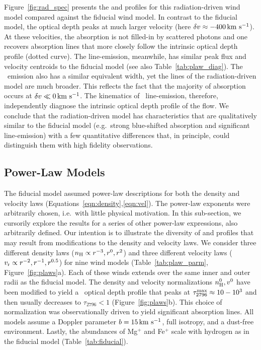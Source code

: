 \documentclass[12pt,preprint]{aastex}
\begin{document}
Figure~\ref{fig:rad_spec} presents the  and 
profiles for this radiation-driven wind model compared against the
fiducial wind model.
In contrast to the fiducial model, 
the optical depth peaks at much larger velocity (here $\delta v
\approx -400 \, {\rm km~s^{-1}}$).  At these velocities, the absorption is not
filled-in by scattered photons and one recovers absorption lines
that more closely follow the intrinsic optical depth profile (dotted
curve). The  line-emission, meanwhile, has
similar peak flux and velocity centroids to the fiducial model (see also
Table~\ref{tab:plaw_diag}).  The \feiis\ emission also has a similar
equivalent width, yet the lines of the radiation-driven model are much
broader. This reflects the fact that the majority of absorption
occurs at $\delta v \ll 0 \, {\rm km~s^{-1}}$.
The kinematics of \feiis\ line-emission, therefore, independently
diagnose the intrinsic optical depth profile of the flow.
We conclude that the radiation-driven model has characteristics that
are qualitatively similar to the fiducial model (e.g.\ strong
blue-shifted absorption and significant line-emission) with a few
quantitative differences that, in principle, could distinguish them
with high fidelity observations.


\subsection{Power-Law Models}
\label{sec:power}

The fiducial model assumed power-law descriptions for both the density and velocity
laws (Equations~\ref{eqn:density},\ref{eqn:vel}).
The power-law exponents were arbitrarily chosen, i.e.\ with little physical
motivation.  In this sub-section, we cursorily explore the results for a series
of other power-law expressions, also arbitrarily defined.
Our intention is to illustrate the diversity of  and
 profiles that may result from modifications to the density
and velocity laws.
We consider three different density laws ($n_{\rm H} \propto
r^{-3}, r^{0}, r^2$) and three different velocity laws ($v_{\rm r}
\propto r^{-2}, r^{-1}, r^{0.5}$) for nine wind models
(Table~\ref{tab:plaw_parm}, Figure~\ref{fig:plaws}a).  
Each of these winds extends over the same inner and outer radii as the
fiducial model.
The density and velocity normalizations $n_{\rm H}^0, v^0$ have been
modified to yield a \mgiia\ optical depth profile that peaks at
$\tau_{2796}^{\rm max} \approx 10-10^3$ and then usually decreases to
$\tau_{2796} < 1$ (Figure~\ref{fig:plaws}b). 
This choice of normalization was observationally driven to yield
significant absorption lines.
All models assume a Doppler parameter
$b=15\, {\rm km~s^{-1}}$, full isotropy, and a dust-free environment.
Lastly, the abundances of Mg$^+$ and Fe$^+$ scale with hydrogen as
in the fiducial model (Table~\ref{tab:fiducial}).
\end{document}
